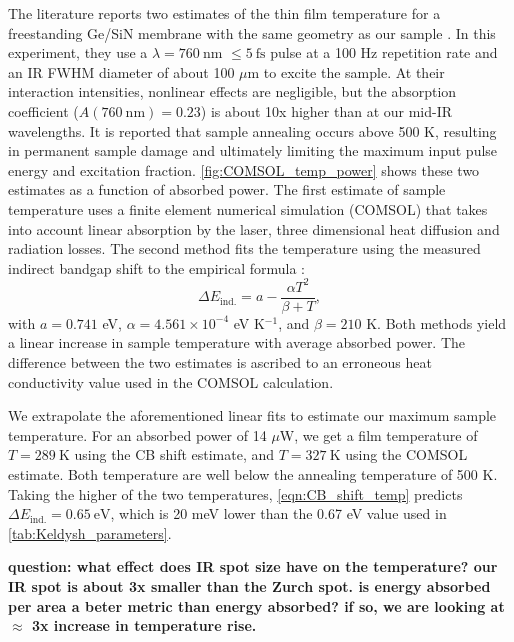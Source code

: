 The literature reports two estimates of the thin film temperature for a freestanding Ge/SiN membrane with the same geometry as our sample \cite{zurchDirectSimultaneousObservation2017}. In this experiment, they use a $\lambda=760 \ \textrm{nm}$ $\le5 \ \textrm{fs}$ pulse at a 100 Hz repetition rate and an IR FWHM diameter of about 100 $\mu$m to excite the sample. At their interaction intensities, nonlinear effects are negligible, but the absorption coefficient ($A (760 \ \textrm{nm}) = 0.23$) is about 10x higher than at our mid-IR wavelengths. It is reported that sample annealing occurs above 500 K, resulting in permanent sample damage and ultimately limiting the maximum input pulse energy and excitation fraction. \cref{fig:COMSOL_temp_power} shows these two estimates as a function of absorbed power. The first estimate of sample temperature uses a finite element numerical simulation (COMSOL) that takes into account linear absorption by the laser, three dimensional heat diffusion and radiation losses. The second method fits the temperature using the measured indirect bandgap shift to the empirical formula \cite{vinaTemperatureDependenceDielectric1984}:
\begin{equation}
\Delta E_{\textrm{ind.}} = a - \frac{\alpha T^2}{\beta + T},
\label{eqn:CB_shift_temp}
\end{equation}
with $a = 0.741$ eV, $\alpha=4.561 \times 10^{-4}$ eV K$^{-1}$, and $\beta = 210$ K. Both methods yield a linear increase in sample temperature with average absorbed power. The difference between the two estimates is ascribed to an erroneous heat conductivity value used in the COMSOL calculation.

We extrapolate the aforementioned linear fits to estimate our maximum sample temperature. For an absorbed power of 14 $\mu$W, we get a film temperature of $T = 289 \ \textrm{K}$ using the CB shift estimate, and $T = 327 \ \textrm{K}$ using the COMSOL estimate. Both temperature are well below the annealing temperature of 500 K. Taking the higher of the two temperatures, \cref{eqn:CB_shift_temp} predicts $\Delta E_{\textrm{ind.}} = 0.65 \ \textrm{eV}$, which is 20 meV lower than the 0.67 eV value used in \cref{tab:Keldysh_parameters}.

\textbf{question: what effect does IR spot size have on the temperature? our IR spot is about 3x smaller than the Zurch spot. is energy absorbed per area a beter metric than energy absorbed? if so, we are looking at $\approx$ 3x increase in temperature rise.}


